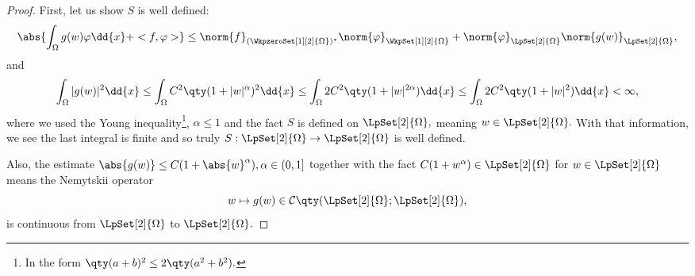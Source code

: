 \begin{example}
\begin{proof}
		First, let us show $S$ is well defined:
		\[
			\abs{\int_{\Omega}g(w) \varphi\dd{x} + <f, \varphi>} \leq \norm{f}_{(\WkpzeroSet[1][2]{\Omega})^{*}} \norm{\varphi}_{\WkpSet[1][2]{\Omega}} + \norm{\varphi}_{\LpSet[2]{\Omega}} \norm{g(w)}_{\LpSet[2]{\Omega}},
		\] and
		\[
			\int_{\Omega}|g(w)|^{2}\dd{x} \leq \int_{\Omega}C^{2}\qty(1+|w|^{\alpha})^{2}\dd{x} \leq \int_{\Omega}2C^{2}\qty(1+|w|^{2 \alpha})\dd{x} \leq \int_{\Omega}2C^{2}\qty(1+|w|^2)\dd{x} < \infty,
		\]
		where we used the Young inequality\footnote{In the form $\qty(a+b)^{2} \leq 2\qty(a^{2}+b^{2}).$}, $\alpha \leq 1$ and the fact $S$ is defined on $\LpSet[2]{\Omega},$ meaning $w \in \LpSet[2]{\Omega}.$ With that information, we see the last integral is finite and so truly $S: \LpSet[2]{\Omega} \to \LpSet[2]{\Omega}$ is well defined.

		Also, the estimate $\abs{g(w)} \leq C(1+\abs{w}^{\alpha}), \alpha \in (0,1]$ together with the fact $C(1+w^{\alpha}) \in \LpSet[2]{\Omega}$ for $w \in \LpSet[2]{\Omega}$ means the Nemytskii operator
		\[
			w \mapsto g(w) \in \mathcal{C}\qty(\LpSet[2]{\Omega}; \LpSet[2]{\Omega}),
		\]
		is continuous from $\LpSet[2]{\Omega}$ to $\LpSet[2]{\Omega}.$


\end{proof}
\end{example}
